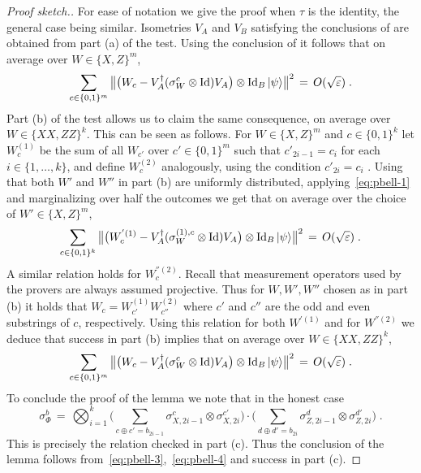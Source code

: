 \documentclass{toc}
\newcommand{\ket}[1]{|#1\rangle}
\newcommand{\Id}{\ensuremath{\mathop{\rm Id}\nolimits}}
\newcommand{\eps}{\varepsilon}
\begin{document}
\begin{proof}[Proof sketch.]
For ease of notation we give the proof when $\tau$ is the identity, the general case being similar. 
Isometries $V_A$ and $V_B$ satisfying the conclusions of 
 are obtained from part (a) of the test. Using the conclusion of  it follows that on average over $W\in\{X,Z\}^m$, 
\begin{equation}\label{eq:pbell-1}
 \sum_{c\in\{0,1\}^m} \big\| \big(W_c -V_A^\dagger (\sigma_W^c \otimes \Id) V_A\big) \otimes \Id_B \ket{\psi} \big\|^2 \,=\, O(\sqrt{\eps})\;.
\end{equation}
Part (b) of the test allows us to claim the same consequence, on average over $W\in\{XX,ZZ\}^k$. This can be seen as follows. For $W\in\{X,Z\}^m$ and $c\in\{0,1\}^k$ let $W^{(1)}_c$ be the sum of all $W_{c'}$ over $c'\in\{0,1\}^m$ such that $c'_{2i-1}=c_i$ for each $i\in \{1,\ldots,k\}$, and define $W^{(2)}_c$ analogously, using the condition $c'_{2i}=c_i$ . Using that both $W'$ and $W''$ in part (b) are uniformly distributed, applying~\eqref{eq:pbell-1} and marginalizing over half the outcomes we get that on average over the choice of $W'\in\{X,Z\}^m $,
\begin{equation}\label{eq:pbell-2}
 \sum_{c\in\{0,1\}^k} \big\| \big(W^{'(1)}_c -V_A^\dagger (\sigma_W^{(1),c} \otimes \Id) V_A\big) \otimes \Id_B \ket{\psi} \big\|^2 \,=\, O(\sqrt{\eps})\;.
\end{equation}
A similar relation holds for $W^{''(2)}_c$. Recall that measurement operators used by the provers are always assumed projective. Thus for $W,W',W''$ chosen as in part (b) it holds that $W_c = W^{(1)}_{c'} W^{(2)}_{c''}$ where $c'$ and $c''$ are the odd and even substrings of $c$, respectively.
%
Using this relation  for both $W^{'(1)}$ and for $W^{''(2)}$ we deduce that success in part (b) implies that on average over $W\in\{XX,ZZ\}^k$,
\begin{equation}\label{eq:pbell-3}
 \sum_{c\in\{0,1\}^m} \big\| \big(W_c -V_A^\dagger (\sigma_W^{c }\otimes \Id) V_A\big) \otimes \Id_B \ket{\psi} \big\|^2 \,=\, O(\sqrt{\eps})\;.
\end{equation}
To conclude the proof of the lemma we note that in the honest case
\begin{equation}\label{eq:pbell-4}
 \sigma_{\Phi}^b \,=\, \bigotimes_{i=1}^k \Big( \sum_{c\oplus c' = b_{2i-1}} \sigma_{X,2i-1}^{c}\otimes \sigma_{X,2i}^{c'}\Big)\cdot\Big(\sum_{d\oplus d' = b_{2i} }\sigma_{Z,2i-1}^{d}\otimes \sigma_{Z,2i}^{d'}\Big)\;.
\end{equation}
This is precisely the relation checked in part (c). Thus the conclusion of the lemma follows from~\eqref{eq:pbell-3},~\eqref{eq:pbell-4} and success in part (c).  
\end{proof}
\end{document}
